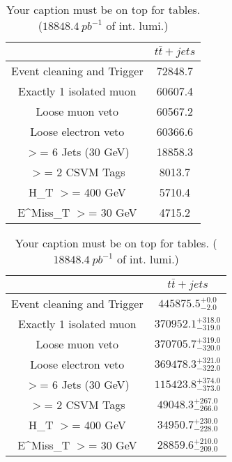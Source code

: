 \documentclass{article}
\begin{document}
\begin{table}
\caption{Your caption must be on top for tables. ($18848.4~pb^{-1}$ of int. lumi.)}
\label{tab:}
\centering
\begin{tabular}{|c|c|}
\toprule
&$t\bar{t}+jets$	\\

\midrule
Event cleaning and Trigger&	72848.7	\\

Exactly 1 isolated muon&	60607.4	\\

Loose muon veto&	60567.2	\\

Loose electron veto&	60366.6	\\

$>$= 6 Jets (30 GeV)&	18858.3	\\

$>$= 2 CSVM Tags&	8013.7	\\

H_{T} $>$=  400 GeV&	5710.4	\\

E^{Miss}_{T} $>$=  30 GeV&	4715.2	\\

\bottomrule
\end{tabular}
\end{table}
\begin{table}
\caption{Your caption must be on top for tables. ($18848.4~pb^{-1}$ of int. lumi.)}
\label{tab:}
\centering
\begin{tabular}{|c|c|}
\toprule
&$t\bar{t}+jets$	\\

\midrule
Event cleaning and Trigger&	$445875.5^{+0.0}_{-2.0}$	\\

Exactly 1 isolated muon&	$370952.1^{+318.0}_{-319.0}$	\\

Loose muon veto&	$370705.7^{+319.0}_{-320.0}$	\\

Loose electron veto&	$369478.3^{+321.0}_{-322.0}$	\\

$>$= 6 Jets (30 GeV)&	$115423.8^{+374.0}_{-373.0}$	\\

$>$= 2 CSVM Tags&	$49048.3^{+267.0}_{-266.0}$	\\

H_{T} $>$=  400 GeV&	$34950.7^{+230.0}_{-228.0}$	\\

E^{Miss}_{T} $>$=  30 GeV&	$28859.6^{+210.0}_{-209.0}$	\\

\bottomrule
\end{tabular}
\end{table}
\end{document}
